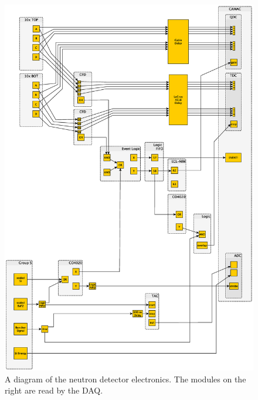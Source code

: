 \begin{figure}[htp]
\centering
\includegraphics[height=0.8\textheight]{figures/electronics.eps}
\caption[Full diagram of the detector electronics.]{A diagram of the neutron detector electronics.  The modules on the right are read by the DAQ.}
\label{fig:fullElectronics}
\end{figure}

